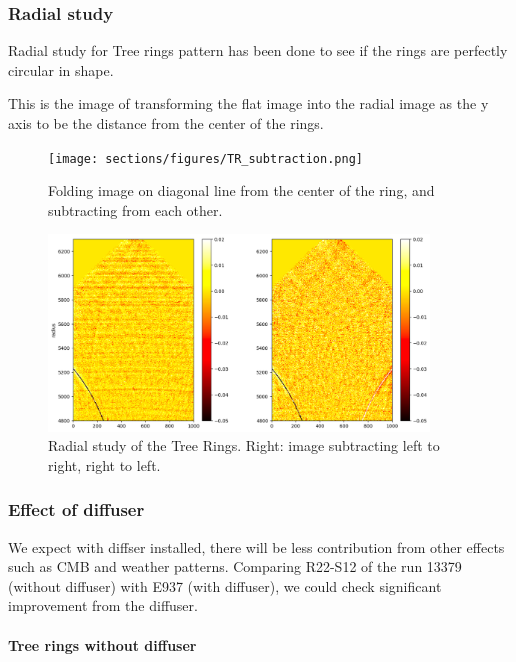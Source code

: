 \subsubsection{Radial study}
Radial study for Tree rings pattern has been done to see if the rings are perfectly circular in shape. 

This is the image of transforming the flat image into the radial image as the y axis to be the distance from the center of the rings. 

\begin{figure}
\begin{centering}
\texttt{[image: sections/figures/TR\_subtraction.png]}
\end{centering}
\caption{Folding image on diagonal line from the center of the ring, and subtracting from each other.}
\end{figure}

\begin{figure}
\begin{centering}
\includegraphics[width=0.9\textwidth]{sections/figures/TR_radial.png}
\end{centering}
\caption{Radial study of the Tree Rings. Right: image subtracting left to right, right to left.}
\end{figure}

\subsubsection{Effect of diffuser}
We expect with diffser installed, there will be less contribution from other effects such as CMB and weather patterns. Comparing R22-S12 of the run 13379 (without diffuser) with E937 (with diffuser), we could check significant improvement from the diffuser.
\paragraph{Tree rings without diffuser}

